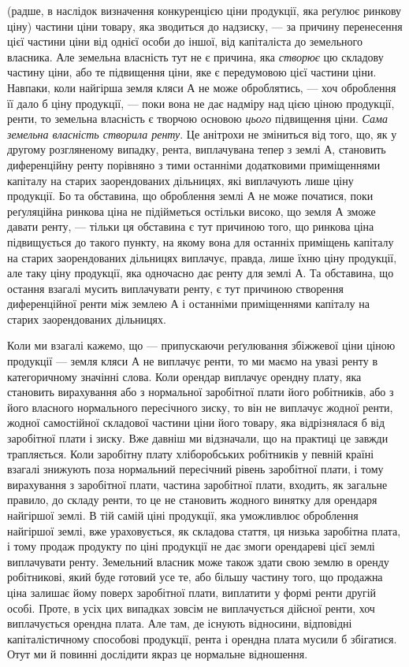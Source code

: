 \parcont{}  %
(радше, в наслідок визначення конкуренцією ціни продукції, яка реґулює ринкову
ціну) частини ціни товару, яка зводиться до надзиску, — за причину перенесення
цієї частини ціни від однієї особи до іншої, від капіталіста до
земельного власника. Але земельна власність тут не є причина, яка \emph{створює}
цю складову частину ціни, або те підвищення ціни, яке є передумовою цієї
частини ціни. Навпаки, коли найгірша земля кляси $А$ не може оброблятись, —
хоч оброблення її дало б ціну продукції, — поки вона не дає надміру над цією
ціною продукції, ренти, то земельна власність є творчою основою \emph{цього} підвищення
ціни. \emph{Сама земельна власність створила ренту}. Це анітрохи не
зміниться від того, що, як у другому розгляненому випадку, рента, виплачувана
тепер з землі $А$, становить диференційну ренту порівняно з тими останніми
додатковими приміщеннями капіталу на старих заорендованих дільницях, які
виплачують лише ціну продукції. Бо та обставина, що оброблення землі $А$
не може початися, поки реґуляційна ринкова ціна не підійметься остільки високо,
що земля $А$ зможе давати ренту, — тільки ця обставина є тут причиною
того, що ринкова ціна підвищується до такого пункту, на якому вона для
останніх приміщень капіталу на старих заорендованих дільницях виплачує,
правда, лише їхню ціну продукції, але таку ціну продукції, яка одночасно
дає ренту для землі $А$. Та обставина, що остання взагалі мусить виплачувати
ренту, є тут причиною створення диференційної ренти між землею $А$ і останніми
приміщеннями капіталу на старих заорендованих дільницях.

Коли ми взагалі кажемо, що — припускаючи реґулювання збіжжевої ціни
ціною продукції — земля кляси $А$ не виплачує ренти, то ми маємо на увазі
ренту в категоричному значінні слова. Коли орендар виплачує орендну плату,
яка становить вирахування або з нормальної заробітної плати його робітників,
або з його власного нормального пересічного зиску, то він не виплачує жодної
ренти, жодної самостійної складової частини ціни його товару, яка відрізнялася б
від заробітної плати і зиску. Вже давніш ми відзначали, що на практиці це
завжди трапляється. Коли заробітну плату хліборобських робітників у певній
країні взагалі знижують поза нормальний пересічний рівень заробітної плати,
і тому вирахування з заробітної плати, частина заробітної плати, входить, як
загальне правило, до складу ренти, то це не становить жодного винятку для
орендаря найгіршої землі. В тій самій ціні продукції, яка уможливлює оброблення
найгіршої землі, вже ураховується, як складова стаття, ця низька заробітна
плата, і тому продаж продукту по ціні продукції не дає змоги орендареві
цієї землі виплачувати ренту. Земельний власник може також здати свою землю
в оренду робітникові, який буде готовий усе те, або більшу частину того, що
продажна ціна залишає йому поверх заробітної плати, виплатити у формі
ренти другій особі. Проте, в усіх цих випадках зовсім не виплачується дійсної
ренти, хоч виплачується орендна плата. Але там, де існують відносини, відповідні
капіталістичному способові продукції, рента і орендна плата мусили б
збігатися. Отут ми й повинні дослідити якраз це нормальне відношення.

